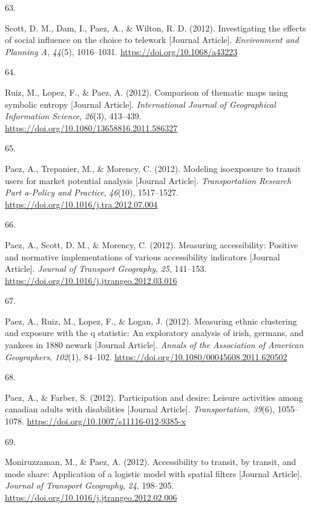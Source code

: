 \documentclass[11pt,a4paper,]{awesome-cv}
\newlength{\csllabelwidth}
\newcommand{\CSLLeftMargin}[1]{\parbox[t]{\csllabelwidth}{#1}}
\newcommand{\CSLRightInline}[1]{\parbox[t]{\linewidth - \csllabelwidth}{#1}}
\begin{document}
\leavevmode{}%
\CSLLeftMargin{63. }
\CSLRightInline{Scott, D. M., Dam, I., Paez, A., \& Wilton, R. D.
(2012). Investigating the effects of social influence on the choice to
telework {[}Journal Article{]}. \emph{Environment and Planning A},
\emph{44}(5), 1016--1031. \url{https://doi.org/10.1068/a43223}}

\leavevmode{}%
\CSLLeftMargin{64. }
\CSLRightInline{Ruiz, M., Lopez, F., \& Paez, A. (2012). Comparison of
thematic maps using symbolic entropy {[}Journal Article{]}.
\emph{International Journal of Geographical Information Science},
\emph{26}(3), 413--439.
\url{https://doi.org/10.1080/13658816.2011.586327}}

\leavevmode{}%
\CSLLeftMargin{65. }
\CSLRightInline{Paez, A., Trepanier, M., \& Morency, C. (2012). Modeling
isoexposure to transit users for market potential analysis {[}Journal
Article{]}. \emph{Transportation Research Part a-Policy and Practice},
\emph{46}(10), 1517--1527.
\url{https://doi.org/10.1016/j.tra.2012.07.004}}

\leavevmode{}%
\CSLLeftMargin{66. }
\CSLRightInline{Paez, A., Scott, D. M., \& Morency, C. (2012). Measuring
accessibility: Positive and normative implementations of various
accessibility indicators {[}Journal Article{]}. \emph{Journal of
Transport Geography}, \emph{25}, 141--153.
\url{https://doi.org/10.1016/j.jtrangeo.2012.03.016}}

\leavevmode{}%
\CSLLeftMargin{67. }
\CSLRightInline{Paez, A., Ruiz, M., Lopez, F., \& Logan, J. (2012).
Measuring ethnic clustering and exposure with the q statistic: An
exploratory analysis of irish, germans, and yankees in 1880 newark
{[}Journal Article{]}. \emph{Annals of the Association of American
Geographers}, \emph{102}(1), 84--102.
\url{https://doi.org/10.1080/00045608.2011.620502}}

\leavevmode{}%
\CSLLeftMargin{68. }
\CSLRightInline{Paez, A., \& Farber, S. (2012). Participation and
desire: Leisure activities among canadian adults with disabilities
{[}Journal Article{]}. \emph{Transportation}, \emph{39}(6), 1055--1078.
\url{https://doi.org/10.1007/s11116-012-9385-x}}

\leavevmode{}%
\CSLLeftMargin{69. }
\CSLRightInline{Moniruzzaman, M., \& Paez, A. (2012). Accessibility to
transit, by transit, and mode share: Application of a logistic model
with spatial filters {[}Journal Article{]}. \emph{Journal of Transport
Geography}, \emph{24}, 198--205.
\url{https://doi.org/10.1016/j.jtrangeo.2012.02.006}}
\end{document}
